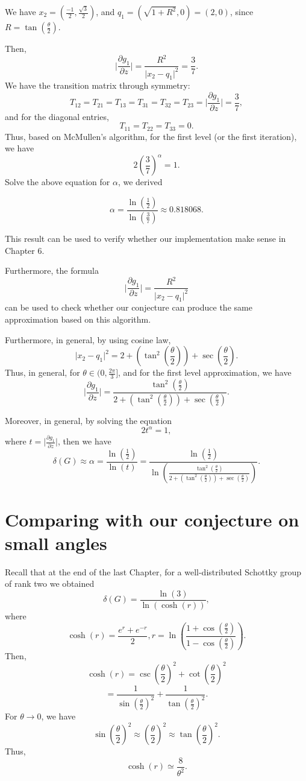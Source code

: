 \documentclass[12pt,oneside]{sfsuthesis}
\theoremstyle{plain} %
\theoremstyle{definition}  %
\theoremstyle{remark}  %
\theoremstyle{plain}
\begin{document}
{We have $x_2=\left(\frac{-1}{2},\frac{\sqrt{3}}{2} \right)$, and $q_1=\left(\sqrt{1+R^2},0 \right)=(2,0)$, since $R=\tan\left( \frac{\theta}{2}\right)$.

Then,
$$
\bigg|\frac{\partial g_1}{\partial z}\bigg|=\frac{R^2}{\vert x_2-q_1\vert^2}=\frac{3}{7}.
$$
We have the transition matrix through symmetry:
$$T_{12}=T_{21}=T_{13}=T_{31}=T_{32}=T_{23}=\bigg|\frac{\partial g_1}{\partial z}\bigg|=\frac{3}{7},$$
and for the diagonal entries,
$$
T_{11}=T_{22}=T_{33}=0.
$$
Thus, based on McMullen's algorithm, for the first level (or the first iteration), we have
$$
2\left(\frac{3}{7}\right)^\alpha=1.
$$
Solve the above equation for $\alpha$, we derived

$$
\alpha=\frac{\ln\left(\frac{1}{2}\right)}{\ln\left(\frac{3}{7}\right)}\approx 0.818068.
$$

This result can be used to verify whether our implementation make sense in Chapter 6.

Furthermore, the formula
$$
\bigg|\frac{\partial g_1}{\partial z}\bigg|=\frac{R^2}{\vert x_2-q_1\vert^2}
$$
can be used to check whether our conjecture can produce the same approximation based on this algorithm.

Furthermore, in general, by using cosine law, 
$$
\vert x_2-q_1\vert^2=2+\left(\tan^2\left(\frac{\theta}{2}\right)\right)+\sec\left(\frac{\theta}{2}\right).
$$
Thus, in general, for $\theta\in(0,\frac{2\pi}{3}]$, and for the first level approximation, we have
$$
\bigg|\frac{\partial g_1}{\partial z}\bigg|=\frac{\tan^2\left(\frac{\theta}{2}\right)}{2+\left(\tan^2\left(\frac{\theta}{2}\right)\right)+\sec\left(\frac{\theta}{2}\right)}.
$$



Moreover, in general, by solving the equation
$$
2t^\alpha=1,
$$
where $t=\bigg|\frac{\partial g_1}{\partial z}\bigg|$, then we have
$$
\delta(G)\approx \alpha=\frac{\ln\left(\frac{1}{2}\right)}{\ln\left(t \right)}
=\frac{\ln\left(\frac{1}{2}\right)}{\ln\left(\frac{\tan^2\left(\frac{\theta}{2}\right)}{2+\left(\tan^2\left(\frac{\theta}{2}\right)\right)+\sec\left(\frac{\theta}{2}\right)} \right)}.
$$



\section{Comparing with our conjecture on small angles}

Recall that at the end of the last Chapter, for a well-distributed Schottky group of rank two we obtained
$$
\delta(G)=\frac{\ln\left( 3\right)}{\ln\left( \cosh\left( r\right)\right)},
$$
where 
$$
\cosh(r)=\frac{e^r+e^{-r}}{2}, r=\ln\left( \frac{1+\cos\left(\frac{\theta}{2}\right)}{1-\cos\left(\frac{\theta}{2}\right)}\right).
$$
Then,
$$
\cosh\left( r\right)=\csc\left(\frac{\theta}{2}\right)^2+\cot\left(\frac{\theta}{2}\right)^2
$$
$$
=\frac{1}{\sin\left(\frac{\theta}{2}\right)^2}+\frac{1}{\tan\left(\frac{\theta}{2}\right)^2}.
$$
For $\theta\to 0$, we have
$$
\sin\left(\frac{\theta}{2}\right)^2\approx \left(\frac{\theta}{2}\right)^2 \approx \tan\left(\frac{\theta}{2}\right)^2.
$$
Thus, 
$$
\cosh\left( r\right)\simeq \frac{8}{\theta^2}.
$$

}
\end{document}
